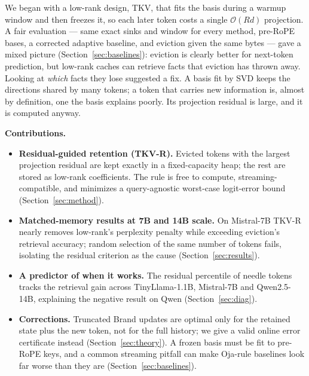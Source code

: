 \documentclass{article}
\begin{document}
We began with a low-rank design, TKV, that fits the basis during a warmup
window and then freezes it, so each later token costs a single
$\mathcal{O}(Rd)$ projection. A fair evaluation --- same exact sinks and
window for every method, pre-RoPE bases, a corrected adaptive baseline, and
eviction given the same bytes --- gave a mixed picture
(Section~\ref{sec:baselines}): eviction is clearly better for next-token
prediction, but low-rank caches can retrieve facts that eviction has thrown
away. Looking at \emph{which} facts they lose suggested a fix. A basis fit by
SVD keeps the directions shared by many tokens; a token that carries new
information is, almost by definition, one the basis explains poorly. Its
projection residual is large, and it is computed anyway.

\textbf{Contributions.}
\begin{itemize}[leftmargin=*,itemsep=1pt]
  \item \textbf{Residual-guided retention (TKV-R).} Evicted tokens with the
        largest projection residual are kept exactly in a fixed-capacity heap;
        the rest are stored as low-rank coefficients. The rule is free to
        compute, streaming-compatible, and minimizes a query-agnostic
        worst-case logit-error bound (Section~\ref{sec:method}).
  \item \textbf{Matched-memory results at 7B and 14B scale.} On Mistral-7B
        TKV-R nearly removes low-rank's perplexity penalty while exceeding
        eviction's retrieval accuracy; random selection of the same number of
        tokens fails, isolating the residual criterion as the cause
        (Section~\ref{sec:results}).
  \item \textbf{A predictor of when it works.} The residual percentile of
        needle tokens tracks the retrieval gain across TinyLlama-1.1B,
        Mistral-7B and Qwen2.5-14B, explaining the negative result on Qwen
        (Section~\ref{sec:diag}).
  \item \textbf{Corrections.} Truncated Brand updates are optimal only for the
        retained state plus the new token, not for the full history; we give a
        valid online error certificate instead (Section~\ref{sec:theory}). A
        frozen basis must be fit to pre-RoPE keys, and a common streaming
        pitfall can make Oja-rule baselines look far worse than they are
        (Section~\ref{sec:baselines}).
\end{itemize}

\end{document}
